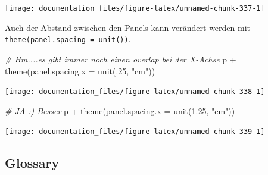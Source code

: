 \documentclass[
]{article}
\newenvironment{Shaded}{\begin{snugshade}}{\end{snugshade}}
\newcommand{\AttributeTok}[1]{\textcolor[rgb]{0.77,0.63,0.00}{#1}}
\newcommand{\CommentTok}[1]{\textcolor[rgb]{0.56,0.35,0.01}{\textit{#1}}}
\newcommand{\DecValTok}[1]{\textcolor[rgb]{0.00,0.00,0.81}{#1}}
\newcommand{\FloatTok}[1]{\textcolor[rgb]{0.00,0.00,0.81}{#1}}
\newcommand{\FunctionTok}[1]{\textcolor[rgb]{0.00,0.00,0.00}{#1}}
\newcommand{\NormalTok}[1]{#1}
\newcommand{\SpecialCharTok}[1]{\textcolor[rgb]{0.00,0.00,0.00}{#1}}
\newcommand{\StringTok}[1]{\textcolor[rgb]{0.31,0.60,0.02}{#1}}
\begin{document}
\begin{center}\texttt{[image: documentation\_files/figure-latex/unnamed-chunk-337-1]} \end{center}

Auch der Abstand zwischen den Panels kann verändert werden mit \texttt{theme(panel.spacing\ =\ unit())}.

\begin{Shaded}
\begin{Highlighting}[]
\CommentTok{\# Hm....es gibt immer noch einen overlap bei der X{-}Achse}
\NormalTok{p }\SpecialCharTok{+} \FunctionTok{theme}\NormalTok{(}\AttributeTok{panel.spacing.x =} \FunctionTok{unit}\NormalTok{(.}\DecValTok{25}\NormalTok{, }\StringTok{"cm"}\NormalTok{))}
\end{Highlighting}
\end{Shaded}

\begin{center}\texttt{[image: documentation\_files/figure-latex/unnamed-chunk-338-1]} \end{center}

\begin{Shaded}
\begin{Highlighting}[]
\CommentTok{\# JA :) Besser}
\NormalTok{p }\SpecialCharTok{+} \FunctionTok{theme}\NormalTok{(}\AttributeTok{panel.spacing.x =} \FunctionTok{unit}\NormalTok{(}\FloatTok{1.25}\NormalTok{, }\StringTok{"cm"}\NormalTok{))}
\end{Highlighting}
\end{Shaded}

\begin{center}\texttt{[image: documentation\_files/figure-latex/unnamed-chunk-339-1]} \end{center}

\hypertarget{glossary}{%
\subsection{Glossary}\label{glossary}}
\end{document}
